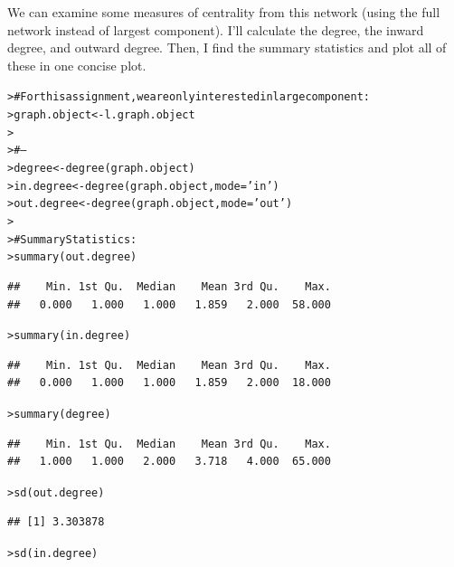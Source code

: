 \documentclass[12pt]{article}\usepackage[]{graphicx}\usepackage[]{color}
\makeatletter
\newcommand{\hlstr}[1]{\textcolor[rgb]{0.82,0.78,0.62}{#1}}%
\newcommand{\hlcom}[1]{\textcolor[rgb]{0.404,0.408,0.42}{#1}}%
\newcommand{\hlstd}[1]{\textcolor[rgb]{0.882,0.878,0.898}{#1}}%
\newcommand{\hlkwb}[1]{\textcolor[rgb]{0.902,0.675,0.196}{#1}}%
\newcommand{\hlkwc}[1]{\textcolor[rgb]{0.812,0.522,0.388}{#1}}%
\newcommand{\hlkwd}[1]{\textcolor[rgb]{0.733,0.388,0.812}{#1}}%
\newenvironment{kframe}{%
 \def\at@end@of@kframe{}%
 \ifinner\ifhmode%
  \def\at@end@of@kframe{\end{minipage}}%
  \begin{minipage}{\columnwidth}%
 \fi\fi%
 \def\FrameCommand##1{\hskip\@totalleftmargin \hskip-\fboxsep
 \colorbox{shadecolor}{##1}\hskip-\fboxsep
     \hskip-\linewidth \hskip-\@totalleftmargin \hskip\columnwidth}%
 \MakeFramed {\advance\hsize-\width
   \@totalleftmargin\z@ \linewidth\hsize
   \@setminipage}}%
 {\par\unskip\endMakeFramed%
 \at@end@of@kframe}
\newenvironment{knitrout}{}{} %
\makeatother
\begin{document}
\begin{flushleft}
We can examine some measures of centrality from this network (using the full network instead of largest component). I'll calculate the degree, the inward degree, and outward degree. Then, I find the summary statistics and plot all of these in one concise plot.

\begin{center}
\begin{knitrout}
\color{fgcolor}\begin{kframe}
\begin{alltt}
\hlstd{> }\hlcom{# For this assignment, we are only interested in large component:}
\hlstd{> }\hlstd{graph.object} \hlkwb{<-} \hlstd{l.graph.object}
\hlstd{> }
\hlstd{> }\hlcom{# --}
\hlstd{> }\hlstd{degree} \hlkwb{<-} \hlkwd{degree}\hlstd{(graph.object)}
\hlstd{> }\hlstd{in.degree} \hlkwb{<-} \hlkwd{degree}\hlstd{(graph.object,} \hlkwc{mode}\hlstd{=}\hlstr{'in'}\hlstd{)}
\hlstd{> }\hlstd{out.degree} \hlkwb{<-} \hlkwd{degree}\hlstd{(graph.object,} \hlkwc{mode}\hlstd{=}\hlstr{'out'}\hlstd{)}
\hlstd{> }
\hlstd{> }\hlcom{# Summary Statistics:}
\hlstd{> }\hlkwd{summary}\hlstd{(out.degree)}
\end{alltt}
\begin{verbatim}
##    Min. 1st Qu.  Median    Mean 3rd Qu.    Max. 
##   0.000   1.000   1.000   1.859   2.000  58.000
\end{verbatim}
\begin{alltt}
\hlstd{> }\hlkwd{summary}\hlstd{(in.degree)}
\end{alltt}
\begin{verbatim}
##    Min. 1st Qu.  Median    Mean 3rd Qu.    Max. 
##   0.000   1.000   1.000   1.859   2.000  18.000
\end{verbatim}
\begin{alltt}
\hlstd{> }\hlkwd{summary}\hlstd{(degree)}
\end{alltt}
\begin{verbatim}
##    Min. 1st Qu.  Median    Mean 3rd Qu.    Max. 
##   1.000   1.000   2.000   3.718   4.000  65.000
\end{verbatim}
\begin{alltt}
\hlstd{> }\hlkwd{sd}\hlstd{(out.degree)}
\end{alltt}
\begin{verbatim}
## [1] 3.303878
\end{verbatim}
\begin{alltt}
\hlstd{> }\hlkwd{sd}\hlstd{(in.degree)}
\end{alltt}
\begin{verbatim}

\end{verbatim}
\end{kframe}
\end{knitrout}
\end{center}
\end{flushleft}
\end{document}
